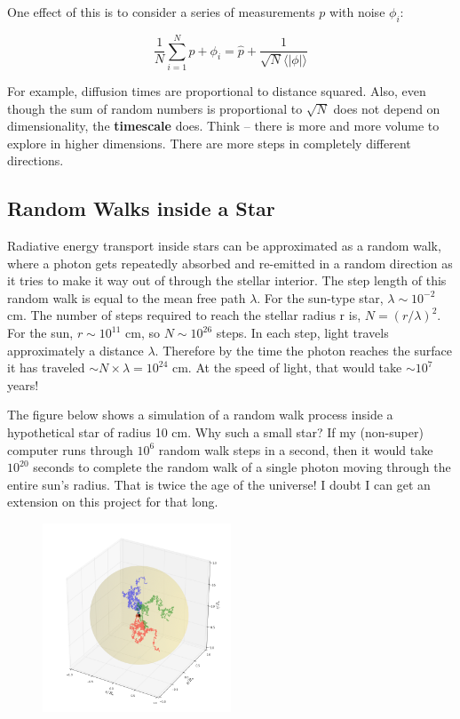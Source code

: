 \documentclass{article}
\begin{document}
One effect of this is to consider a series of measurements $p$ with noise $\phi_i$:

\begin{equation}
    \frac{1}{N} \sum_{i=1}^{N} p+\phi_i = \hat{p} + \frac{1}{\sqrt{N}\langle |\phi|\rangle}
\end{equation}

For example, diffusion times are proportional to distance squared. Also, even though the sum of random numbers is proportional to $\sqrt{N}$ does not depend on dimensionality, the \textbf{timescale} does. Think -- there is more and more volume to explore in higher dimensions. There are more steps in completely different directions.

\subsection{Random Walks inside a Star}

Radiative energy transport inside stars can be approximated as a random walk, where a photon gets repeatedly absorbed and re-emitted in a random direction as it tries to make it way out of through the stellar interior. The step length of this random walk is equal to the mean free path $\lambda$. For the sun-type star, $\lambda \sim 10^{-2}$ cm. The number of steps required to reach the stellar radius r is, $N = (r/\lambda)^{2}$. For the sun, $r \sim 10^{11}$ cm, so $N \sim 10^{26} $ steps. In each step, light travels approximately a distance $\lambda$. Therefore by the time the photon reaches the surface it has traveled $\sim N \times \lambda = 10^{24}$ cm. At the speed of light, that would take $\sim 10^{7}$ years! 

The figure below shows a simulation of a random walk process inside a hypothetical star of radius 10 cm. Why such a small star? If my (non-super) computer runs through $10^{6}$ random walk steps in a second, then it would take $10^{20}$ seconds to complete the random walk of a single photon moving through the entire sun's radius. That is twice the age of the universe! I doubt I can get an extension on this project for that long. 

\begin{figure}[h!]
    \centering
    \includegraphics[width=0.5\textwidth]{Random_walk.png}
    \caption{}
    \label{fig:random_walk}
\end{figure}
\end{document}
